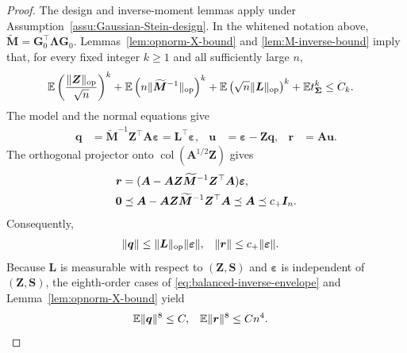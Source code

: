 \documentclass{article}
\theoremstyle{plain}
\theoremstyle{definition}
\theoremstyle{definition}
\newcommand{\boldzero}{\mathbf{0}}
\DeclarePairedDelimiter\norm{\lVert}{\rVert}
\def\E{{\mathbb{E}}}
\def\mathbold{\boldsymbol}
\def\cal{\mathcal}
\def\bA{\mathbold{A}}\def\calA{{\cal A}}\def\scrA{{\mathscr A}}\def\Ahat{\widehat{A}}\def\Atil{{\widetilde A}}
\def\bG{\mathbold{G}}\def\calG{{\cal G}}\def\scrG{{\mathscr G}}\def\Ghat{\widehat{G}}\def\Gtil{{\widetilde G}}
\def\bI{\mathbold{I}}\def\hbI{{\widehat{\bI}}}\def\tbI{{\widetilde{\bI}}}
\def\bL{\mathbold{L}}\def\hbL{{\widehat{\bL}}}\def\tbL{{\widetilde{\bL}}}
\def\bM{\mathbold{M}}\def\hbM{{\widehat{\bM}}}\def\tbM{{\widetilde{\bM}}}
\def\bq{\mathbold{q}}\def\qhat{\widehat{q}}\def\qtil{\widetilde{q}}\def\qbar{{\overline q}}
\def\br{\mathbold{r}}\def\rhat{\widehat{r}}\def\rtil{\widetilde{r}}\def\rbar{{\overline r}}
\def\bS{\mathbold{S}}\def\hbS{{\widehat{\bS}}}\def\tbS{{\widetilde{\bS}}}
\def\bu{\mathbold{u}}\def\uhat{\widehat{u}}\def\util{\widetilde{u}}\def\ubar{{\overline u}}
\def\bZ{\mathbold{Z}}\def\hbZ{{\widehat{\bZ}}}\def\tbZ{{\widetilde{\bZ}}}
\def\ep{\varepsilon}\def\eps{\epsilon}\def\veps{\varepsilon}
\def\bep{ {\mathbold{\ep} }}
\def\bLambda{\mathbold{\Lambda}}\def\hbLambda{{\widehat{\bLambda}}}
\def\bSigma{\mathbold{\Sigma}}\def\hbSigma{{\widehat{\bSigma}}}
\begin{document}
\begin{proof}
The design and inverse-moment lemmas apply under
Assumption~\ref{assu:Gaussian-Stein-design}.  In the whitened notation above,
$\widetilde{\bM}=\bG_0^\top\bLambda\bG_0$.
Lemmas~\ref{lem:opnorm-X-bound} and \ref{lem:M-inverse-bound} imply that,
for every fixed integer $k\geq1$ and all sufficiently large $n$,
\begin{align}
    \E\left(\frac{\norm{\bZ}_{\rm op}}{\sqrt n}\right)^k
    +\E\left(n\norm{\widetilde{\bM}^{-1}}_{\rm op}\right)^k
    +\E\left(\sqrt n\norm{\bL}_{\rm op}\right)^k
    +\E t_{\bSigma}^k
    &\leq C_k.
    \label{eq:balanced-inverse-envelope}
\end{align}
The model and the normal equations give
\begin{align}
    \bq&=\widetilde{\bM}^{-1}\bZ^\top\bA\bep
        =\bL^\top\bep,
    & \bu&=\bep-\bZ\bq,
    & \br&=\bA\bu.
    \label{eq:balanced-qur}
\end{align}
The orthogonal projector onto $\operatorname{col}(\bA^{1/2}\bZ)$ gives
\begin{align}
    \br&=(\bA-\bA\bZ\widetilde{\bM}^{-1}\bZ^\top\bA)\bep,
    \notag\\
    \boldzero&\preceq\bA-\bA\bZ\widetilde{\bM}^{-1}\bZ^\top\bA
       \preceq\bA\preceq c_+\bI_n.
    \label{eq:balanced-residual-contraction}
\end{align}
Consequently,
\begin{align*}
    \norm{\bq}&\leq\norm{\bL}_{\rm op}\norm{\bep},
    & \norm{\br}&\leq c_+\norm{\bep}.
\end{align*}
Because $\bL$ is measurable with respect to $(\bZ,\bS)$ and $\bep$ is
independent of $(\bZ,\bS)$, the eighth-order cases of
\eqref{eq:balanced-inverse-envelope} and
Lemma~\ref{lem:opnorm-X-bound} yield
\begin{align}
    \E\norm{\bq}^{8}&\leq C,
    & \E\norm{\br}^{8}&\leq Cn^4.
    \label{eq:balanced-response-sufficient-conditions}
\end{align}


\end{proof}
\end{document}
